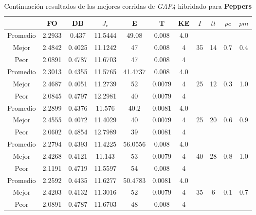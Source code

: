 \begin{table}[h!]
    \footnotesize
    \begin{center}
        \begin{tabular}{|c|c|c|c|c|c|c|c|c|c|c|}
        \hline
             & {\bf FO} & {\bf DB} & $J_e$ & {\bf E} & {\bf T} & {\bf KE} & $I$ & $tt$ & $pc$ & $pm$ \\
        \hline
        \hline
            Promedio  & 2.2933 & 0.437 & 11.5444 & 49.08 & 0.008 & 4.0 &  &  &  & \\
            \cline{1-7}
            Mejor & 2.4842 & 0.4025  & 11.1242 & 47 & 0.008 & 4 & 35 & 14 & 0.7 & 0.4\\
            \cline{1-7}
            Peor & 2.0891 & 0.4787  & 11.6703 & 47 & 0.008 & 4 &  &  &  & \\
        \hline
        \hline
            Promedio  & 2.3013 & 0.4355 & 11.5765 & 41.4737 & 0.008 & 4.0 &  &  &  & \\
            \cline{1-7}
            Mejor & 2.4687 & 0.4051  & 11.2739 & 52 & 0.0079 & 4 & 25 & 12 & 0.3 & 1.0\\
            \cline{1-7}
            Peor & 2.0845 & 0.4797  & 12.2981 & 40 & 0.0079 & 4 &  &  &  & \\
        \hline
        \hline
            Promedio  & 2.2899 & 0.4376 & 11.576 & 40.2 & 0.0081 & 4.0 &  &  &  & \\
            \cline{1-7}
            Mejor & 2.4555 & 0.4072  & 11.4029 & 40 & 0.0079 & 4 & 25 & 20 & 0.6 & 0.9\\
            \cline{1-7}
            Peor & 2.0602 & 0.4854  & 12.7989 & 39 & 0.0081 & 4 &  &  &  & \\
        \hline
        \hline
            Promedio  & 2.2794 & 0.4393 & 11.4225 & 56.0556 & 0.008 & 4.0 &  &  &  & \\
            \cline{1-7}
            Mejor & 2.4268 & 0.4121  & 11.143 & 53 & 0.0079 & 4 & 40 & 28 & 0.8 & 1.0\\
            \cline{1-7}
            Peor & 2.1191 & 0.4719  & 11.5597 & 54 & 0.008 & 4 &  &  &  & \\
        \hline
        \hline
            Promedio  & 2.2592 & 0.4435 & 11.6277 & 50.4783 & 0.0081 & 4.0 &  &  &  & \\
            \cline{1-7}
            Mejor & 2.4203 & 0.4132  & 11.3016 & 52 & 0.0079 & 4 & 35 & 6 & 0.1 & 0.7\\
            \cline{1-7}
            Peor & 2.0891 & 0.4787  & 11.6703 & 48 & 0.008 & 4 &  &  &  & \\
        \hline
        \end{tabular}
        \caption{Continuaci\'on resultados de las mejores corridas de \emph{GAP4} hibridado para {\bf Peppers}}
        \label{tb:tablecGAP4}
    \end{center}
\end{table}
